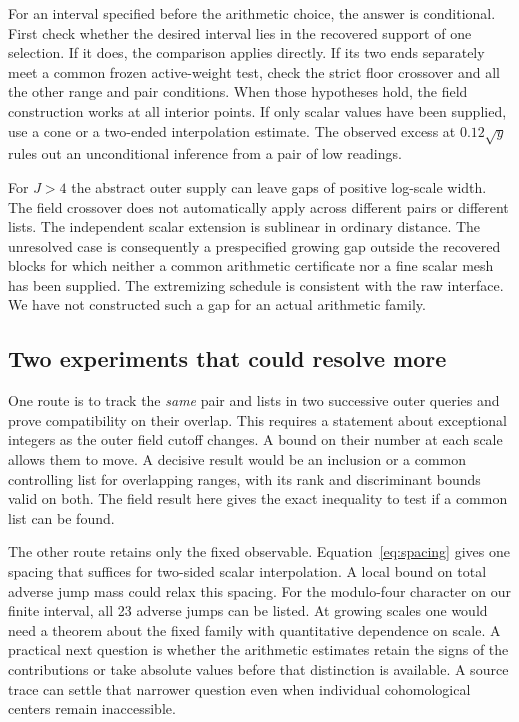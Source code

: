 \documentclass[12pt,letterpaper]{article}
\begin{document}
For an interval specified before the arithmetic choice, the answer is conditional. First check whether the desired interval lies in the recovered support of one selection. If it does, the comparison applies directly. If its two ends separately meet a common frozen active-weight test, check the strict floor crossover and all the other range and pair conditions. When those hypotheses hold, the field construction works at all interior points. If only scalar values have been supplied, use a cone or a two-ended interpolation estimate. The observed excess at \(0.12\sqrt y\) rules out an unconditional inference from a pair of low readings.

For \(J>4\) the abstract outer supply can leave gaps of positive log-scale width. The field crossover does not automatically apply across different pairs or different lists. The independent scalar extension is sublinear in ordinary distance. The unresolved case is consequently a prespecified growing gap outside the recovered blocks for which neither a common arithmetic certificate nor a fine scalar mesh has been supplied. The extremizing schedule is consistent with the raw interface. We have not constructed such a gap for an actual arithmetic family.

\subsection{Two experiments that could resolve more}
One route is to track the \emph{same} pair and lists in two successive outer queries and prove compatibility on their overlap. This requires a statement about exceptional integers as the outer field cutoff changes. A bound on their number at each scale allows them to move. A decisive result would be an inclusion or a common controlling list for overlapping ranges, with its rank and discriminant bounds valid on both. The field result here gives the exact inequality to test if a common list can be found.

The other route retains only the fixed observable. Equation~\eqref{eq:spacing} gives one spacing that suffices for two-sided scalar interpolation. A local bound on total adverse jump mass could relax this spacing. For the modulo-four character on our finite interval, all 23 adverse jumps can be listed. At growing scales one would need a theorem about the fixed family with quantitative dependence on scale. A practical next question is whether the arithmetic estimates retain the signs of the contributions or take absolute values before that distinction is available. A source trace can settle that narrower question even when individual cohomological centers remain inaccessible.
\end{document}
